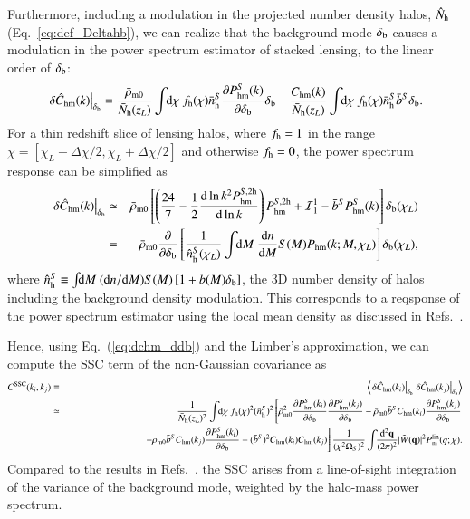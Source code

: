 \documentclass[onecolumn,notitlepage,showpacs,amsmath,amssymb,prd,floatfix]{revtex4-1}
\def\ave#1{\left\langle #1 \right\rangle}
\newcommand{\bq}{{\bf q}}
\newcommand{\tW}{\tilde{W}}
\newcommand{\dr}{\mathrm{d}}
\newcommand{\deltab}{\delta_{\rm b}}
\newcommand{\phm}{P_{\mathrm{hm}}}
\newcommand{\chm}{C_{\mathrm{hm}}}
\newcommand{\hchm}{\hat{C}_{\mathrm{hm}}}
\newcommand{\bnh}{\frac{\dr n}{\dr M}}
\newcommand{\bnhs}{\bar{n}_{\rm h}^S}
\newcommand{\pml}{P^{\rm lin}_{\rm m}}
\newcommand{\hNh}{\hat{N}_{\rm h}}
\newcommand{\bNh}{\bar{N}_{\rm h}}
\newcommand{\hnh}{\hat{n}_{\mathrm{h}}}
\begin{document}
Furthermore, including a modulation in the projected number density
halos, $\hNh$ (Eq.~\ref{eq:def_Deltahb}), we can realize that the
background mode $\deltab$ causes a modulation in the power spectrum
estimator of stacked lensing, to the linear order of $\deltab$:
%
\begin{equation}
 \left.\delta\hchm(k)\right|_{\deltab}=
  \frac{\bar{\rho}_{\rm m0}}{\bNh(z_L)}\int\!\!\dr\chi~f_{\rm h}(\chi)\bnhs
  \frac{\partial \phm^S(k)}{\partial
  \deltab}\deltab-\frac{\chm(k)}{\bNh(z_L)}\int\!\!\dr\chi~f_{\rm h}(\chi)\bnhs\bar{b}^S\deltab.
\label{eq:dchm_ddb}
\end{equation}
%
For a thin redshift slice of lensing halos, where $f_{\rm h}=1$ in the
range $\chi=[\chi_L-\Delta\chi/2,\chi_L+\Delta\chi/2]$ and otherwise
$f_{\rm h}=0$, the power spectrum response can be simplified as
%
\begin{eqnarray}
 \left.\delta\hchm(k)\right|_{\deltab}&\simeq& \bar{\rho}_{\rm m0}
  \left[\left(\frac{24}{7}-\frac{1}{2}\frac{\dr\ln k^2\phm^{S,{\rm
	 2h}}}{\dr \ln k}\right)\phm^{S,{\rm 2h}}+{\cal
  I}^1_1-\bar{b}^S\phm^S(k)\right]\deltab(\chi_L)\nonumber\\
  &=&\bar{\rho}_{\rm m0}\frac{\partial }{\partial \deltab}
  \left[\frac{1}{\hnh^S(\chi_L)}\int\!\!\dr M~\bnh S(M)\phm(k;M,\chi_L)
  \right]\deltab(\chi_L),
\end{eqnarray}
%
where $\hnh^S\equiv \int\!\!\dr M~(\dr n/\dr M)S(M)\left[1+b(M)\deltab\right]$, the
3D number density of halos including the background density modulation.
This corresponds to a reqsponse of the power spectrum estimator using
the local mean density as discussed in Refs.~\cite{TakadaHu:13,Lietal:14a}.

Hence, using Eq.~(\ref{eq:dchm_ddb}) and the Limber's approximation, we
can compute the SSC term of the non-Gaussian covariance as
%
\begin{eqnarray}
 C^{\rm SSC}(k_i,k_j)&\equiv&
  \ave{\left.\delta\hchm(k_i)\right|_{\deltab}
  \left.\delta\hchm(k_j)\right|_{\deltab}}\nonumber\\
  &\simeq &\frac{1}{\bNh(z_L)^2}
  \int\!\!\dr\chi~f_{\rm h}(\chi)^2(\bnhs)^2\left[
  \bar{\rho}_{\rm m0}^2\frac{\partial \phm^S(k_i)}{\partial \deltab}
  \frac{\partial \phm^S(k_j)}{\partial \deltab}
  -\bar{\rho}_{\rm m0}\bar{b}^S
  \chm(k_i)\frac{\partial \phm^S(k_j)}{\partial
  \deltab}\right.\nonumber\\
 &&\hspace{8em}\left.
-\bar{\rho}_{\rm m0}\bar{b}^S\chm(k_j)\frac{\partial \phm^S(k_i)}{\partial \deltab}
+(\bar{b}^S)^2\chm(k_i)\chm(k_j)
		\right]\frac{1}{(\chi^2\Omega_S)^2}\int\!\!\frac{\dr^2\bq}{(2\pi)^2}|\tW(\bq)|^2\pml(q;\chi).
\label{eq:cov_ssc}
\end{eqnarray}
%
Compared to the results in Refs.~\cite{TakadaHu:13,Lietal:14a}, the SSC
arises from a line-of-sight integration of the variance of the
background mode, weighted by the halo-mass power spectrum.
\end{document}
